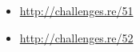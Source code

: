 \subsection{\Exercises}

\begin{itemize}
	\item \url{http://challenges.re/51}
	\item \url{http://challenges.re/52}
\end{itemize}


